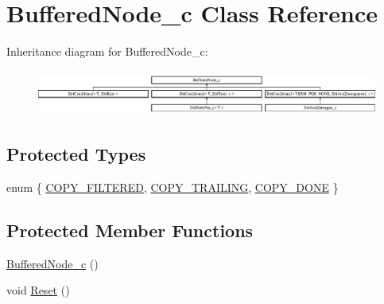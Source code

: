 \hypertarget{classBufferedNode__c}{\section{Buffered\-Node\-\_\-c Class Reference}
\label{classBufferedNode__c}
}
Inheritance diagram for Buffered\-Node\-\_\-c\-:\begin{figure}[H]
\begin{center}
\leavevmode
\includegraphics[height=1.493333cm]{classBufferedNode__c}
\end{center}
\end{figure}
\subsection*{Protected Types}
\begin{DoxyCompactItemize}
\item 
enum \{ \hyperlink{classBufferedNode__c_a793684ae096dcc1517b56f7470bde4eba8cb4b9bb47a5b7fa340bf81ce085233c}{C\-O\-P\-Y\-\_\-\-F\-I\-L\-T\-E\-R\-E\-D}, 
\hyperlink{classBufferedNode__c_a793684ae096dcc1517b56f7470bde4ebaf076efcdcc4831afa6620eba4174e9c0}{C\-O\-P\-Y\-\_\-\-T\-R\-A\-I\-L\-I\-N\-G}, 
\hyperlink{classBufferedNode__c_a793684ae096dcc1517b56f7470bde4eba3f22afbf0e47d6f648385c82411b671a}{C\-O\-P\-Y\-\_\-\-D\-O\-N\-E}
 \}
\end{DoxyCompactItemize}
\subsection*{Protected Member Functions}
\begin{DoxyCompactItemize}
\item 
\hyperlink{classBufferedNode__c_a185d78e7a5aa4c217d8a1034aa9e2a9c}{Buffered\-Node\-\_\-c} ()
\item 
void \hyperlink{classBufferedNode__c_aaf8cede24abd22de730118a2f3f90401}{Reset} ()
\end{DoxyCompactItemize}
